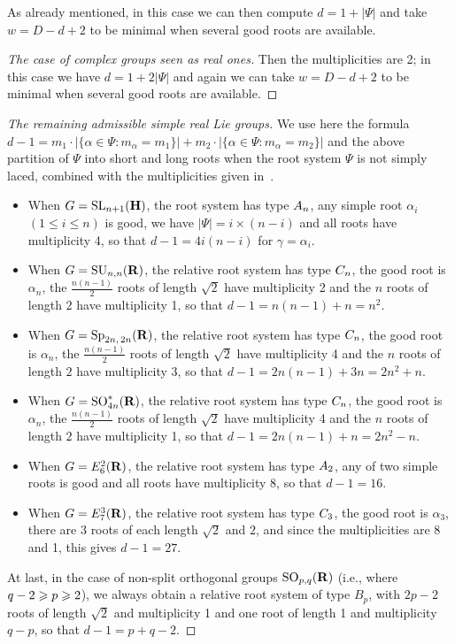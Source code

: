 \documentclass[11pt]{article}
\theoremstyle{definition}
\numberwithin{equation}{section}
\numberwithin{figure}{section}
\numberwithin{table}{section}
\DeclareMathOperator{\SL}{SL}
\DeclareMathOperator{\SU}{SU}
\DeclareMathOperator{\SO}{SO}
\DeclareMathOperator{\Sp}{Sp}
\newenvironment{step}[1]{\begin{proof}[#1]}{\let\qed\relax\end{proof}}
\begin{document}
As already mentioned, in this case we can then compute $d=1+|\Psi|$ and take $w=D-d+2$ to be minimal when several good roots are available.

\begin{step}{The case of complex groups seen as real ones}
Then the multiplicities are 2; in this case we have $d=1+2|\Psi|$ and again we can take $w=D-d+2$ to be minimal when several good roots are available.
\end{step}
\begin{step}{The remaining admissible simple real Lie groups}
We use here the formula $d-1 = m_1 \cdot | \{\alpha \in \Psi : m_\alpha = m_1 \}| + m_2 \cdot | \{\alpha \in \Psi : m_\alpha = m_2 \}|$ and the above partition of $\Psi$ into short and long roots when the root system $\Psi$ is not simply laced, combined with the multiplicities given in~\cite[Table~VI, pp.~532--534]{Helgason}.
\begin{itemize}
\item When $G = {\SL}_{n+1}({\bf H})$, the root system has type ${\rm A}_n$, any simple root $\alpha_i$ $(1 \leqslant i \leqslant n)$ is good, we have $|\Psi| = i \times (n-i)$ and all roots have multiplicity 4, so that $d-1 = 4i(n-i)$ for $\gamma=\alpha_i$.
\item When $G = {\SU}_{n,n}({\bf R})$, the relative root system has type ${\rm C}_n$, the good root is $\alpha_n$, the $\frac{n(n-1)}{2}$ roots of length $\sqrt{2}$ have multiplicity 2 and the $n$ roots of length $2$ have multiplicity 1, so that $d-1 = n(n-1)+n=n^2$.
\item When $G = {\Sp}_{2n,\,2n}({\bf R})$, the relative root system has type ${\rm C}_n$, the good root is $\alpha_n$, the $\frac{n(n-1)}{2}$ roots of length $\sqrt{2}$ have multiplicity 4 and the $n$ roots of length $2$ have multiplicity 3, so that $d-1 = 2n(n-1)+3n = 2n^2+n$.
\item When $G = {\SO}^*_{4n}({\bf R})$, the relative root system has type ${\rm C}_n$, the good root is $\alpha_n$, the $\frac{n(n-1)}{2}$ roots of length $\sqrt{2}$ have multiplicity 4 and the $n$ roots of length $2$ have multiplicity 1, so that $d-1 = 2n(n-1)+n = 2n^2-n$.
\item When $G = {\rm E}_6^2({\bf R})$, the relative root system has type ${\rm A}_2$, any of two simple roots is good and all roots have multiplicity 8, so that $d-1=16$.
\item When $G = {\rm E}_7^3({\bf R})$, the relative root system has type ${\rm C}_3$, the good root is $\alpha_3$, there are 3 roots of each length $\sqrt{2}$ and $2$, and since the multiplicities are 8 and 1, this gives $d-1=27$.
\end{itemize}

At last, in the case of non-split orthogonal groups ${\SO}_{p,q}({\bf R})$ (i.e., where $q-2\linebreak\geqslant p \geqslant 2$), we always obtain a relative root system of type $B_p$, with $2p-2$ roots of length $\sqrt{2}$ and multiplicity 1 and one root of length 1 and multiplicity $q-p$, so that $d-1=p+q-2$.
\end{step}
\end{document}
